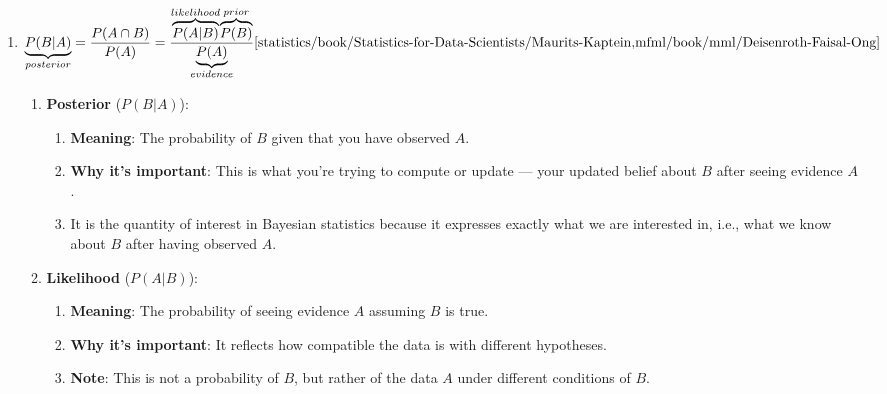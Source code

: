\begin{enumerate}
    \item
    \begin{theorem}
        \[
            \underset{posterior}{\underbrace{P(B|A)}}
            = \dfrac{P(A\cap B)}{P(A)}
            = \dfrac{
                \overset{likelihood}{\overbrace{P(A|B)}}
                \overset{prior}{\overbrace{P(B)}}
            }{
                \underset{evidence}{\underbrace{P(A)}}
            }
            \hfill \text{\cite{statistics/book/Statistics-for-Data-Scientists/Maurits-Kaptein,mfml/book/mml/Deisenroth-Faisal-Ong}}
        \]
    \end{theorem}
    \begin{enumerate}
        \item \textbf{Posterior} ($P(B|A)$):
        \begin{enumerate}
            \item \textbf{Meaning}: The probability of $B$ given that you have observed $A$.
            \hfill \cite{common/online/chatgpt}

            \item \textbf{Why it's important}: This is what you’re trying to compute or update — your updated belief about $B$ after seeing evidence $A$.
            \hfill \cite{common/online/chatgpt}

            \item It is the quantity of interest in Bayesian statistics because it expresses exactly what we are interested in, i.e., what we know about $B$ after having observed $A$.
            \hfill\cite{mfml/book/mml/Deisenroth-Faisal-Ong}
        \end{enumerate}

        \item \textbf{Likelihood} ($P(A|B)$):
        \begin{enumerate}
            \item \textbf{Meaning}: The probability of seeing evidence $A$ assuming $B$ is true.
            \hfill \cite{common/online/chatgpt}

            \item \textbf{Why it's important}: It reflects how compatible the data is with different hypotheses.
            \hfill \cite{common/online/chatgpt}

            \item \textbf{Note}: This is not a probability of $B$, but rather of the data $A$ under different conditions of $B$.
            \hfill \cite{common/online/chatgpt}


\end{enumerate}
\end{enumerate}
\end{enumerate}
